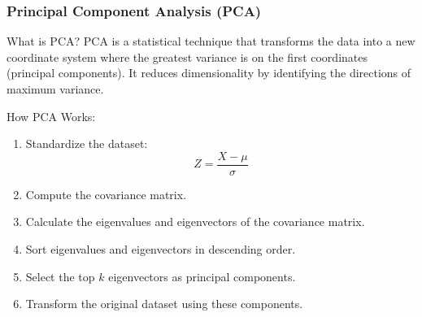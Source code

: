 \documentclass[aspectratio=169]{beamer}
\begin{document}
\begin{frame}[fragile]
    \frametitle{Principal Component Analysis (PCA)}
    \begin{block}{What is PCA?}
        PCA is a statistical technique that transforms the data into a new coordinate system where the greatest variance is on the first coordinates (principal components). It reduces dimensionality by identifying the directions of maximum variance.
    \end{block}
    
    \begin{block}{How PCA Works:}
        \begin{enumerate}
            \item Standardize the dataset: 
            \begin{equation}
                Z = \frac{X - \mu}{\sigma}
            \end{equation}
            \item Compute the covariance matrix.
            \item Calculate the eigenvalues and eigenvectors of the covariance matrix.
            \item Sort eigenvalues and eigenvectors in descending order.
            \item Select the top \(k\) eigenvectors as principal components.
            \item Transform the original dataset using these components.
        \end{enumerate}
    \end{block}
\end{frame}
\end{document}

